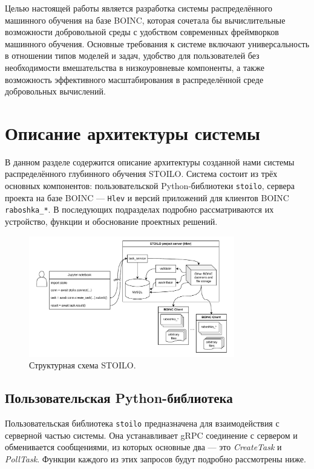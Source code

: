 \documentclass[a4paper,12pt]{extarticle}
\begin{document}
Целью настоящей работы является разработка системы распределённого машинного обучения на базе BOINC, которая сочетала бы вычислительные возможности добровольной среды с удобством современных фреймворков машинного обучения. Основные требования к системе включают универсальность в отношении типов моделей и задач, удобство для пользователей без необходимости вмешательства в низкоуровневые компоненты, а также возможность эффективного масштабирования в распределённой среде добровольных вычислений.

\section{Описание архитектуры системы}

В данном разделе содержится описание архитектуры созданной нами системы распределённого глубинного обучения STOILO. Система состоит из трёх основных компонентов: пользовательской Python-библиотеки \texttt{stoilo}, сервера проекта на базе BOINC — \texttt{Hlev} и версий приложений для клиентов BOINC \texttt{raboshka\_*}. В последующих подразделах подробно рассматриваются их устройство, функции и обоснование проектных решений.

\begin{figure}[ht]
	\centering
	\includegraphics[width=0.8\textwidth]{stoilo_overall.drawio.pdf}
	\caption{Структурная схема STOILO.}
	\label{fig:stoilo_overall}
\end{figure}

\subsection{Пользовательская Python-библиотека}

Пользовательская библиотека \texttt{stoilo} предназначена для взаимодействия с серверной частью системы. Она устанавливает gRPC соединение с сервером и обменивается сообщениями, из которых основные два — это \textit{CreateTask} и \textit{PollTask}. Функции каждого из этих запросов будут подробно рассмотрены ниже.
\end{document}
